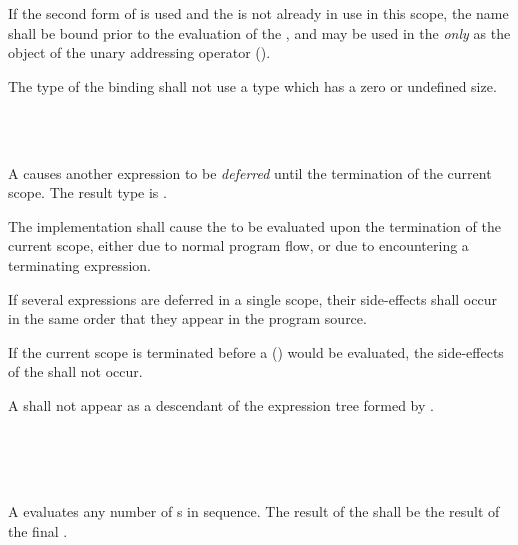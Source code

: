 \specsubsubitem
If the second form of  is used and the 
is not already in use in this scope, the name shall be bound prior to the
evaluation of the , and may be used in the
 \textit{only} as the object of the unary addressing
operator (\terminal{\&}).

\specsubsubitem
The type of the binding shall not use a type which has a zero or undefined size.


\begin{grammar}
 \\
	  \\
\end{grammar}

\specsubsubitem
A  causes another expression to be
\textit{deferred} until the termination of the current scope. The result type
is .

\specsubsubitem
The implementation shall cause the  to be evaluated
upon the termination of the current scope, either due to normal program flow,
or due to encountering a terminating expression.

\specsubsubitem
If several expressions are deferred in a single scope, their side-effects shall
occur in the same order that they appear in the program source.

\specsubsubitem
If the current scope is terminated before a 
() would be
evaluated, the side-effects of the  shall not occur.

\specsubsubitem
A  shall not appear as a descendant of the
expression tree formed by .


\begin{grammar}
 \\
	 \terminal{;} \\
	 \terminal{;}  \\
\end{grammar}

\specsubsubitem
A  evaluates any number of
s in sequence. The result of the
 shall be the result of the final
.

